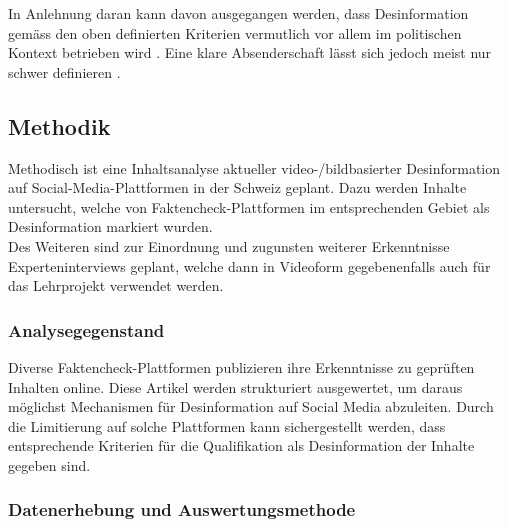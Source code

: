 \documentclass[12pt,a4paper]{article}        %
\begin{document}
In Anlehnung daran kann davon ausgegangen werden, dass Desinformation gemäss den oben definierten Kriterien vermutlich vor allem im politischen Kontext betrieben wird \parencites[vgl.][51]{sammer_fake_2021}[217]{allcott_social_2017}[498]{behnke_manipulation_2018}. Eine klare Absenderschaft lässt sich jedoch meist nur schwer definieren \parencite[498-499]{behnke_manipulation_2018}.

\subsection{Methodik}
Methodisch ist eine Inhaltsanalyse aktueller video-/bildbasierter Desinformation auf Social-Media-Plattformen in der Schweiz geplant. Dazu werden Inhalte untersucht, welche von Faktencheck-Plattformen im entsprechenden Gebiet als Desinformation markiert wurden. \\
Des Weiteren sind zur Einordnung und zugunsten weiterer Erkenntnisse Experteninterviews geplant, welche dann in Videoform gegebenenfalls auch für das Lehrprojekt verwendet werden.

\subsubsection{Analysegegenstand}
Diverse Faktencheck-Plattformen publizieren ihre Erkenntnisse zu geprüften Inhalten online. Diese Artikel werden strukturiert ausgewertet, um daraus möglichst Mechanismen für Desinformation auf Social Media abzuleiten. Durch die Limitierung auf solche Plattformen kann sichergestellt werden, dass entsprechende Kriterien für die Qualifikation als Desinformation der Inhalte gegeben sind.

\subsubsection{Datenerhebung und Auswertungsmethode}
\end{document}
